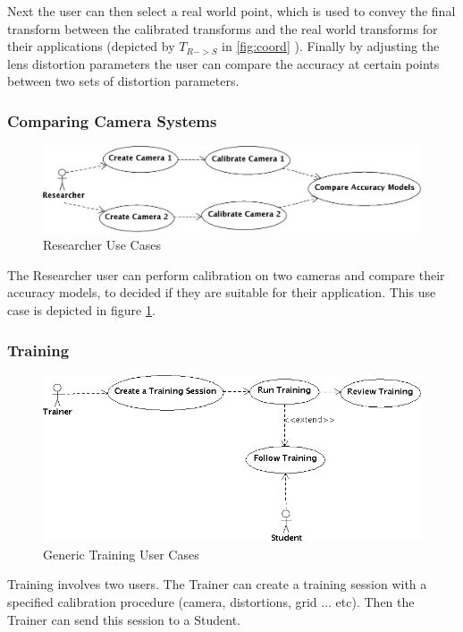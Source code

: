 \documentclass[11pt]{report}
\begin{document}
Next the user can then select a real world point, which is used to convey the final transform between the calibrated transforms and the real world transforms for their applications (depicted by \( T_{R->S} \) in \ref{fig:coord} ). Finally by adjusting the lens distortion parameters the user can compare the accuracy at certain points between two sets of distortion parameters.  
\subsubsection{Comparing Camera Systems} 

    \begin{figure}[htp]
    \centering
    \includegraphics[scale=0.15]{images/CompareCameras.png}
    \caption{Researcher Use Cases}
    \label{fig:ucc}
    \end{figure}

    The Researcher user can perform calibration on two cameras and compare their accuracy models, to decided if they are suitable for their application. This use case is depicted in figure \ref{fig:ucc}.

\subsubsection{Training}

    \begin{figure}[htp]
    \centering
    \includegraphics[scale=0.45]{images/Training.png}
    \caption{Generic Training User Cases}
    \label{fig:uco}
    \end{figure}

    Training involves two users. The Trainer can create a training session with a specified calibration procedure (camera, distortions, grid ... etc). Then the Trainer can send this session to a Student. 
\end{document}
